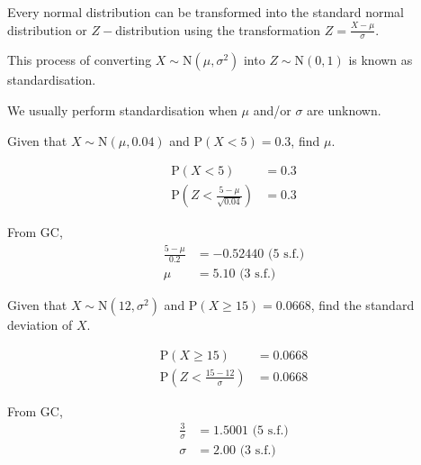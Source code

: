\documentclass[11pt,a4paper]{book}
\begin{document}
Every normal distribution can be transformed into the standard normal
distribution or $Z-$distribution using the transformation ${\displaystyle Z=\frac{X-\mu}{\sigma}}$. 

This process of converting $X\sim\text{N}\left(\mu,\sigma^{2}\right)$
into $Z\sim\text{N}\left(0,1\right)$ is known as standardisation.

We usually perform standardisation when $\mu$ and/or $\sigma$ are
unknown.

\begin{example}

Given that $X\sim\text{N}\left(\mu,0.04\right)$ and $\text{P}\left(X<5\right)=0.3$,
find $\mu$.

\Solution

\begin{align*}
\text{P}\left(X<5\right) & =0.3\\
\text{P}\left(Z<\frac{5-\mu}{\sqrt{0.04}}\right) & =0.3
\end{align*}

From GC,
\begin{align*}
\frac{5-\mu}{0.2} & =-0.52440\text{ (5 s.f.)}\\
\mu & =5.10\text{ (3 s.f.)}
\end{align*}

\end{example}

\begin{example}

Given that $X\sim\text{N}\left(12,\sigma^{2}\right)$ and $\text{P}\left(X\geq15\right)=0.0668$,
find the standard deviation of $X$.

\Solution

\begin{align*}
\text{P}\left(X\geq15\right) & =0.0668\\
\text{P}\left(Z<\frac{15-12}{\sigma}\right) & =0.0668
\end{align*}

From GC, 
\begin{align*}
\frac{3}{\sigma} & =1.5001\text{ (5 s.f.)}\\
\sigma & =2.00\text{ (3 s.f.)}
\end{align*}

\end{example}

\newpage
\end{document}
